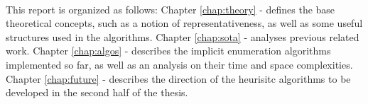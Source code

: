 \paragraph{}
This report is organized as follows:
Chapter \ref{chap:theory} -  defines the base theoretical concepts, such as a notion of representativeness, as well as some useful structures used in the algorithms. Chapter \ref{chap:sota} -  analyses previous related work. Chapter \ref{chap:algos} -  describes the implicit enumeration algorithms implemented so far, as well as an analysis on their time and space complexities. Chapter \ref{chap:future} -  describes the direction of the heurisitc algorithms to be developed in the second half of the thesis. 